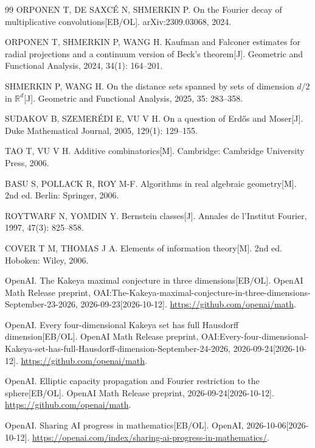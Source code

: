 \begin{thebibliography}{99}
ORPONEN T, DE SAXC\'E N, SHMERKIN P. On the Fourier decay of multiplicative convolutions[EB/OL]. arXiv:2309.03068, 2024.

ORPONEN T, SHMERKIN P, WANG H. Kaufman and Falconer estimates for radial projections and a continuum version of Beck's theorem[J]. Geometric and Functional Analysis, 2024, 34(1): 164--201.

SHMERKIN P, WANG H. On the distance sets spanned by sets of dimension $d/2$ in $\mathbb{R}^d$[J]. Geometric and Functional Analysis, 2025, 35: 283--358.

SUDAKOV B, SZEMER\'EDI E, VU V H. On a question of Erd\H{o}s and Moser[J]. Duke Mathematical Journal, 2005, 129(1): 129--155.

TAO T, VU V H. Additive combinatorics[M]. Cambridge: Cambridge University Press, 2006.

BASU S, POLLACK R, ROY M-F. Algorithms in real algebraic geometry[M]. 2nd ed. Berlin: Springer, 2006.

ROYTWARF N, YOMDIN Y. Bernstein classes[J]. Annales de l'Institut Fourier, 1997, 47(3): 825--858.

COVER T M, THOMAS J A. Elements of information theory[M]. 2nd ed. Hoboken: Wiley, 2006.

OpenAI. The Kakeya maximal conjecture in three dimensions[EB/OL]. OpenAI Math Release preprint, OAI:The-Kakeya-maximal-conjecture-in-three-dimensions-September-23-2026, 2026-09-23[2026-10-12]. \url{https://github.com/openai/math}.

OpenAI. Every four-dimensional Kakeya set has full Hausdorff dimension[EB/OL]. OpenAI Math Release preprint, OAI:Every-four-dimensional-Kakeya-set-has-full-Hausdorff-dimension-September-24-2026, 2026-09-24[2026-10-12]. \url{https://github.com/openai/math}.

OpenAI. Elliptic capacity propagation and Fourier restriction to the sphere[EB/OL]. OpenAI Math Release preprint, 2026-09-24[2026-10-12]. \url{https://github.com/openai/math}.

OpenAI. Sharing AI progress in mathematics[EB/OL]. OpenAI, 2026-10-06[2026-10-12]. \url{https://openai.com/index/sharing-ai-progress-in-mathematics/}.


\end{thebibliography}
